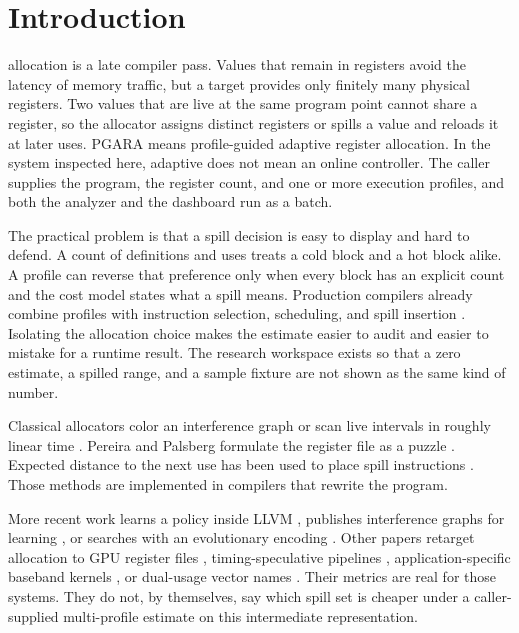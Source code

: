 \documentclass{ieeeaccess}
\begin{document}
\section{Introduction}
\label{sec:introduction}
 allocation is a late compiler pass.
Values that remain in registers avoid the latency of memory traffic, but a target provides only finitely many physical registers.
Two values that are live at the same program point cannot share a register, so the allocator assigns distinct registers or spills a value and reloads it at later uses.
PGARA means profile-guided adaptive register allocation.
In the system inspected here, adaptive does not mean an online controller.
The caller supplies the program, the register count, and one or more execution profiles, and both the analyzer and the dashboard run as a batch.

The practical problem is that a spill decision is easy to display and hard to defend.
A count of definitions and uses treats a cold block and a hot block alike.
A profile can reverse that preference only when every block has an explicit count and the cost model states what a spill means.
Production compilers already combine profiles with instruction selection, scheduling, and spill insertion \cite{liu2025,lattner2004}.
Isolating the allocation choice makes the estimate easier to audit and easier to mistake for a runtime result.
The research workspace exists so that a zero estimate, a spilled range, and a sample fixture are not shown as the same kind of number.

Classical allocators color an interference graph \cite{chaitin1981,chaitin1982,briggs1994,george1996} or scan live intervals in roughly linear time \cite{poletto1999,traub1998,wimmer2005}.
Pereira and Palsberg formulate the register file as a puzzle \cite{pereira2008}.
Expected distance to the next use has been used to place spill instructions \cite{burroughs2016}.
Those methods are implemented in compilers that rewrite the program.

More recent work learns a policy inside LLVM \cite{venkatakeerthy2022}, publishes interference graphs for learning \cite{silva2024}, or searches with an evolutionary encoding \cite{terci2024}.
Other papers retarget allocation to GPU register files \cite{oh2022}, timing-speculative pipelines \cite{xiao2022,xiao2023}, application-specific baseband kernels \cite{chen2022}, or dual-usage vector names \cite{hu2022}.
Their metrics are real for those systems.
They do not, by themselves, say which spill set is cheaper under a caller-supplied multi-profile estimate on this intermediate representation.
\end{document}
